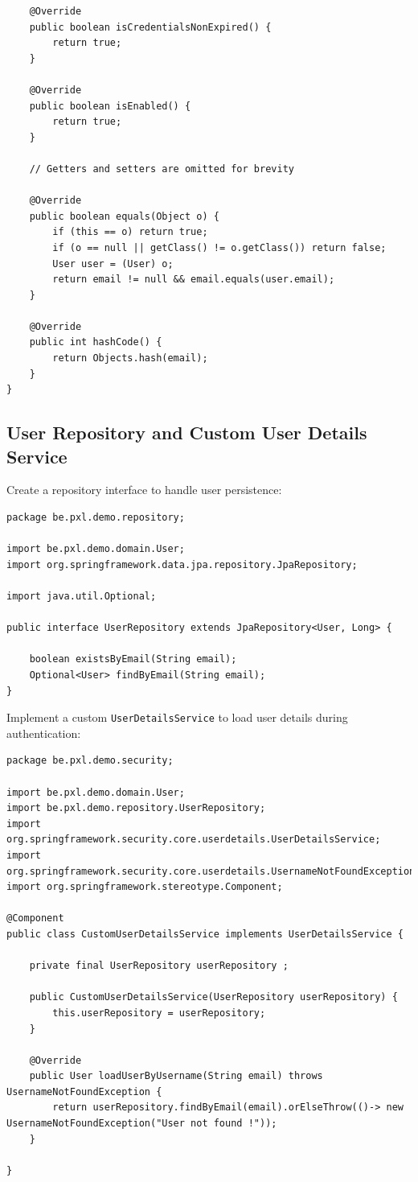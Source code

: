 \begin{lstlisting}
    @Override
    public boolean isCredentialsNonExpired() {
        return true;
    }

    @Override
    public boolean isEnabled() {
        return true;
    }

    // Getters and setters are omitted for brevity

    @Override
    public boolean equals(Object o) {
        if (this == o) return true;
        if (o == null || getClass() != o.getClass()) return false;
        User user = (User) o;
        return email != null && email.equals(user.email);
    }

    @Override
    public int hashCode() {
        return Objects.hash(email);
    }
}
\end{lstlisting}

\subsection*{User Repository and Custom User Details Service}

Create a repository interface to handle user persistence:

\begin{lstlisting}
package be.pxl.demo.repository;

import be.pxl.demo.domain.User;
import org.springframework.data.jpa.repository.JpaRepository;

import java.util.Optional;

public interface UserRepository extends JpaRepository<User, Long> {

    boolean existsByEmail(String email);
    Optional<User> findByEmail(String email);
}
\end{lstlisting}

Implement a custom \texttt{UserDetailsService} to load user details during authentication:

\begin{lstlisting}
package be.pxl.demo.security;

import be.pxl.demo.domain.User;
import be.pxl.demo.repository.UserRepository;
import org.springframework.security.core.userdetails.UserDetailsService;
import org.springframework.security.core.userdetails.UsernameNotFoundException;
import org.springframework.stereotype.Component;

@Component
public class CustomUserDetailsService implements UserDetailsService {

    private final UserRepository userRepository ;

    public CustomUserDetailsService(UserRepository userRepository) {
        this.userRepository = userRepository;
    }

    @Override
    public User loadUserByUsername(String email) throws UsernameNotFoundException {
        return userRepository.findByEmail(email).orElseThrow(()-> new UsernameNotFoundException("User not found !"));
    }

}
\end{lstlisting}

